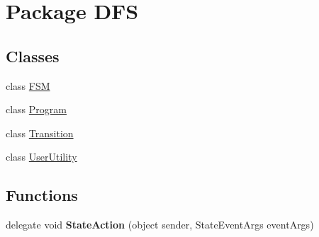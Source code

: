 \hypertarget{namespace_d_f_s}{}\section{Package D\+F\+S}
\label{namespace_d_f_s}
\subsection*{Classes}
\begin{DoxyCompactItemize}
\item 
class \hyperlink{class_d_f_s_1_1_f_s_m}{F\+S\+M}
\item 
class \hyperlink{class_d_f_s_1_1_program}{Program}
\item 
class \hyperlink{class_d_f_s_1_1_transition}{Transition}
\item 
class \hyperlink{class_d_f_s_1_1_user_utility}{User\+Utility}
\end{DoxyCompactItemize}
\subsection*{Functions}
\begin{DoxyCompactItemize}
\item 
\hypertarget{namespace_d_f_s_a8df22e043742e78816ce69af82102054}{}delegate void {\bfseries State\+Action} (object sender, State\+Event\+Args event\+Args)\label{namespace_d_f_s_a8df22e043742e78816ce69af82102054}

\end{DoxyCompactItemize}
